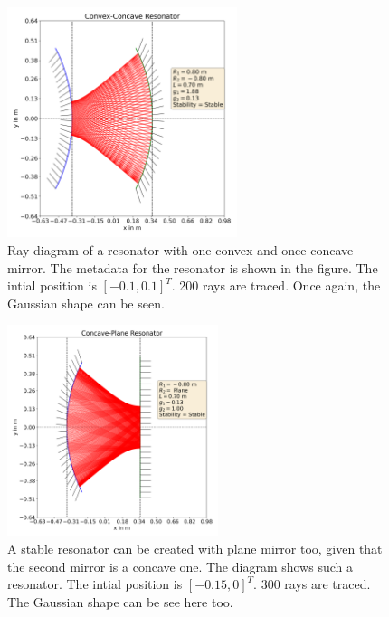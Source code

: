 \documentclass[12pt]{article}
\begin{document}
\begin{figure}
    \centering
    \includegraphics[width=0.6\textwidth]{images/cave_vex.png}
    \caption{Ray diagram of a resonator with one convex and once concave mirror. The metadata for the resonator is shown in the figure. The intial position is \([-0.1, 0.1]^T\). 200 rays are traced. Once again, the Gaussian shape can be seen.}
    \label{fig:cave-vex}
\end{figure}

\begin{figure}
    \centering
    \includegraphics[width=0.55\textwidth]{images/plane_cave.png}
    \caption{A stable resonator can be created with plane mirror too, given that the second mirror is a concave one. The diagram shows such a resonator. The intial position is \([-0.15, 0]^T\). 300 rays are traced. The Gaussian shape can be see here too.}
    \label{fig:plane-vex}
\end{figure}
\end{document}
